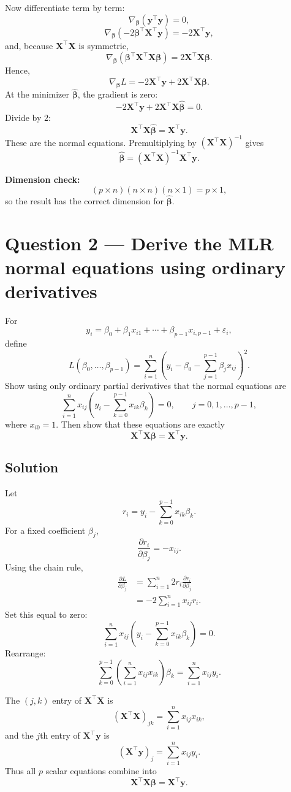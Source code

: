 ﻿\documentclass[11pt]{article}
\newcommand{\yvec}{\mathbf y}
\newcommand{\bvec}{\boldsymbol\beta}
\newcommand{\xmat}{\mathbf X}
\begin{document}
Now differentiate term by term:
\[
\nabla_{\bvec}(\yvec^\top\yvec)=0,
\]
\[
\nabla_{\bvec}(-2\bvec^\top\xmat^\top\yvec)
=-2\xmat^\top\yvec,
\]
and, because $\xmat^\top\xmat$ is symmetric,
\[
\nabla_{\bvec}
\left(\bvec^\top\xmat^\top\xmat\bvec\right)
=2\xmat^\top\xmat\bvec.
\]
Hence,
\[
\boxed{
\nabla_{\bvec}L
=-2\xmat^\top\yvec+2\xmat^\top\xmat\bvec
}.
\]
At the minimizer $\widehat{\bvec}$, the gradient is zero:
\[
-2\xmat^\top\yvec
+2\xmat^\top\xmat\widehat{\bvec}=0.
\]
Divide by $2$:
\[
\xmat^\top\xmat\widehat{\bvec}=\xmat^\top\yvec.
\]
These are the normal equations. Premultiplying by $(\xmat^\top\xmat)^{-1}$ gives
\[
\boxed{
\widehat{\bvec}=(\xmat^\top\xmat)^{-1}\xmat^\top\yvec
}.
\]

\textbf{Dimension check:}
\[
(p\times n)(n\times n)(n\times1)=p\times1,
\]
so the result has the correct dimension for $\widehat{\bvec}$.

\newpage
\section*{Question 2 --- Derive the MLR normal equations using ordinary derivatives}
For
\[
y_i=\beta_0+\beta_1x_{i1}+\cdots+\beta_{p-1}x_{i,p-1}+\varepsilon_i,
\]
define
\[
L(\beta_0,\ldots,\beta_{p-1})
=\sum_{i=1}^n
\left(y_i-\beta_0-\sum_{j=1}^{p-1}\beta_jx_{ij}\right)^2.
\]
Show using only ordinary partial derivatives that the normal equations are
\[
\sum_{i=1}^n x_{ij}
\left(y_i-\sum_{k=0}^{p-1}x_{ik}\beta_k\right)=0,
\qquad j=0,1,\ldots,p-1,
\]
where $x_{i0}=1$. Then show that these equations are exactly
\[
\xmat^\top\xmat\bvec=\xmat^\top\yvec.
\]

\subsection*{Solution}
Let
\[
r_i=y_i-\sum_{k=0}^{p-1}x_{ik}\beta_k.
\]
For a fixed coefficient $\beta_j$,
\[
\frac{\partial r_i}{\partial\beta_j}=-x_{ij}.
\]
Using the chain rule,
\begin{align*}
\frac{\partial L}{\partial\beta_j}
&=\sum_{i=1}^n2r_i\frac{\partial r_i}{\partial\beta_j}\\
&=-2\sum_{i=1}^n x_{ij}r_i.
\end{align*}
Set this equal to zero:
\[
\sum_{i=1}^n x_{ij}
\left(y_i-\sum_{k=0}^{p-1}x_{ik}\beta_k\right)=0.
\]
Rearrange:
\[
\sum_{k=0}^{p-1}
\left(\sum_{i=1}^n x_{ij}x_{ik}\right)\beta_k
=\sum_{i=1}^n x_{ij}y_i.
\]

The $(j,k)$ entry of $\xmat^\top\xmat$ is
\[
(\xmat^\top\xmat)_{jk}=\sum_{i=1}^n x_{ij}x_{ik},
\]
and the $j$th entry of $\xmat^\top\yvec$ is
\[
(\xmat^\top\yvec)_j=\sum_{i=1}^n x_{ij}y_i.
\]
Thus all $p$ scalar equations combine into
\[
\boxed{\xmat^\top\xmat\bvec=\xmat^\top\yvec}.
\]
\end{document}

